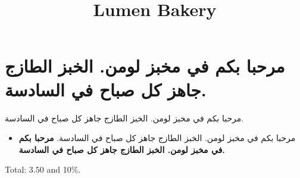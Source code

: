 \documentclass{article}
\title{Lumen Bakery}
\begin{document}
\maketitle
\section{مرحبا بكم في مخبز لومن. الخبز الطازج جاهز كل صباح في السادسة.}
مرحبا بكم في مخبز لومن. الخبز الطازج جاهز كل صباح في السادسة.

\begin{itemize}
\item مرحبا بكم في مخبز لومن. الخبز الطازج جاهز كل صباح في السادسة. \textbf{مرحبا بكم في مخبز لومن. الخبز الطازج جاهز كل صباح في السادسة.}
\end{itemize}
Total: $3.50$ and 10\%.
\end{document}
